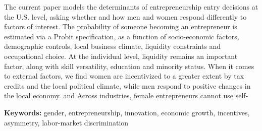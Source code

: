 The current paper models the determinants of entrepreneurship entry decisions at the U.S. level, asking whether and how men and women respond differently to factors of interest. The probability of someone becoming an entrepreneur is estimated via a Probit specification, as a function of socio-economic factors, demographic controls, local business climate, liquidity constraints and occupational choice. At the individual level, liquidity remains an important factor, along with skill versatility, education and minority status. When it comes to external factors, we find women are incentivized to a greater extent by tax credits and the local political climate, while men respond to positive changes in the local economy. and Across industries, female entrepreneurs cannot use self- 

\textbf{Keywords:} gender, entrepreneurship, innovation, economic growth, incentives, asymmetry, labor-market discrimination 
